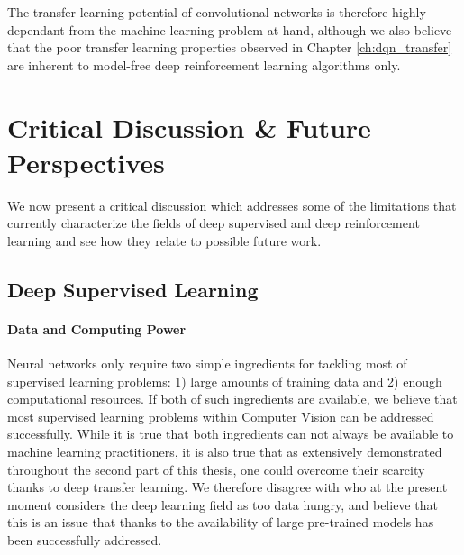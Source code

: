 \begin{enumerate}
The transfer learning potential of convolutional networks is therefore highly dependant from the machine learning problem at hand, although we also believe that the poor transfer learning properties observed in Chapter \ref{ch:dqn_transfer} are inherent to model-free deep reinforcement learning algorithms only.


\end{enumerate}


\section{Critical Discussion \& Future Perspectives}
\label{sec:critical_discussion}

We now present a critical discussion which addresses some of the limitations that currently characterize the fields of deep supervised and deep reinforcement learning and see how they relate to possible future work.

\subsection{Deep Supervised Learning}
\label{sec:supervised_learning}

\paragraph{\textbf{\uppercase{D}ata and \uppercase{C}omputing \uppercase{P}ower}}
Neural networks only require two simple ingredients for tackling most of supervised learning problems: 1) large amounts of training data and 2) enough computational resources. If both of such ingredients are available, we believe that most supervised learning problems within Computer Vision can be addressed successfully. While it is true that both ingredients can not always be available to machine learning practitioners, it is also true that as extensively demonstrated throughout the second part of this thesis, one could overcome their scarcity thanks to deep transfer learning. We therefore disagree with \citet{marcus2018deep} who at the present moment considers the deep learning field as too data hungry, and believe that this is an issue that thanks to the availability of large pre-trained models has been successfully addressed.  


